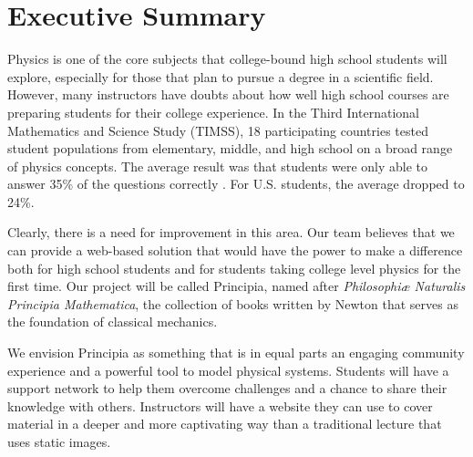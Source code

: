 \section{Executive Summary}

\BgThispage
Physics is one of the core subjects that college-bound high school students will explore, especially for those that plan to pursue a degree in a scientific field. However, many instructors have doubts about how well high school courses are preparing students for their college experience. In the Third International Mathematics and Science Study (TIMSS), 18 participating countries tested student populations from elementary, middle, and high school on a broad range of physics concepts. The average result was that students were only able to answer 35\% of the questions correctly \cite{TIMSS}. For U.S. students, the average dropped to 24\%.

Clearly, there is a need for improvement in this area. Our team believes that we can provide a web-based solution that would have the power to make a difference both for high school students and for students taking college level physics for the first time. Our project will be called Principia, named after \textit{Philosophiæ Naturalis Principia Mathematica}, the collection of books written by Newton that serves as the foundation of classical mechanics. 

We envision Principia as something that is in equal parts an engaging community experience and a powerful tool to model physical systems. Students will have a support network to help them overcome challenges and a chance to share their knowledge with others. Instructors will have a website they can use to cover material in a deeper and more captivating way than a traditional lecture that uses static images.

